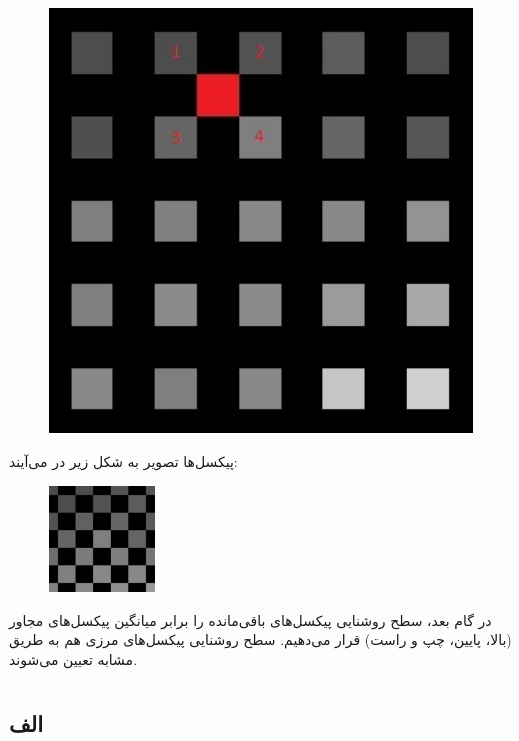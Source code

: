 \documentclass{article}
\begin{document}
\begin{figure}[H]
    \centering
    \includegraphics[width=1.0\textwidth]{figures/5b.jpg}
    \caption
	{}
    \label{fig:fig1}
\end{figure}
پیکسل‌ها تصویر به شکل زیر در می‌آیند:
\begin{figure}[H]
    \centering
    \includegraphics[width=0.25\textwidth]{figures/5c.jpg}
    \caption
	{}
    \label{fig:fig1}
\end{figure}
در گام بعد، سطح روشنایی پیکسل‌های باقی‌مانده را برابر میانگین پیکسل‌های مجاور (بالا، پایین، چپ و راست) قرار می‌دهیم. سطح روشنایی پیکسل‌های مرزی هم به طریق مشابه تعیین می‌شوند.



\section{}%
\subsection{الف}
\end{document}
